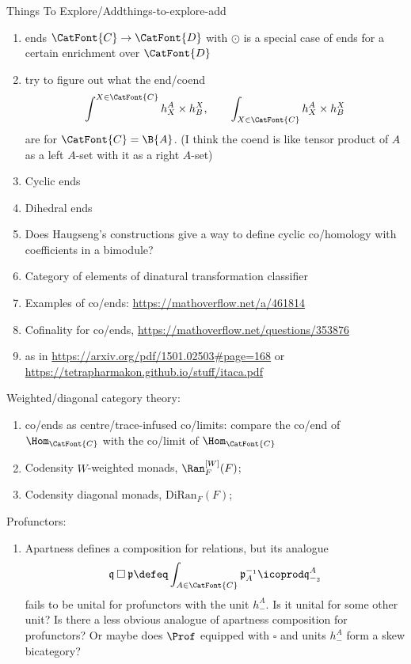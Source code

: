 \begin{remark}{Things To Explore/Add}{things-to-explore-add}
\begin{enumerate}
\[\begin{aligned}
                    \int^{A\in\CatFont{C}}\Sets(F_{A},h^{A})
                \end{aligned}
            \]%
            are.
        \item ends $\CatFont{C}\to\CatFont{D}$ with $\odot$ is a special case of ends for a certain enrichment over $\CatFont{D}$
        \item try to figure out what the end/coend
            \[
                \int^{X\in\CatFont{C}}h^{A}_{X}\times h^{X}_{B},%
                \qquad%
                \int_{X\in\CatFont{C}}h^{A}_{X}\times h^{X}_{B}%
            \]%
            are for $\CatFont{C}=\B{A}$. (I think the coend is like tensor product of $A$ as a left $A$-set with it as a right $A$-set)
        \item Cyclic ends
        \item Dihedral ends
        \item Does Haugseng's constructions give a way to define cyclic co/homology with coefficients in a bimodule?
        \item Category of elements of dinatural transformation classifier
        \item Examples of co/ends: \url{https://mathoverflow.net/a/461814}
        \item Cofinality for co/ends, \url{https://mathoverflow.net/questions/353876}
        \item {} as in \url{https://arxiv.org/pdf/1501.02503#page=168} or \url{https://tetrapharmakon.github.io/stuff/itaca.pdf}
    \end{enumerate}
    Weighted/diagonal category theory:
    \begin{enumerate}
        \item co/ends as centre/trace-infused co/limits: compare the co/end of $\Hom_{\CatFont{C}}$ with the co/limit of $\Hom_{\CatFont{C}}$
        \item Codensity $W$-weighted monads, $\Ran^{[W]}_{F}(F)$;
        \item Codensity diagonal monads, $\mathrm{DiRan}_{F}(F)$;
    \end{enumerate}
    Profunctors:
    \begin{enumerate}
        \item Apartness defines a composition for relations, but its analogue
            \[
                \mathfrak{q}\mathbin{\square}\mathfrak{p}%
                \defeq%
                \int_{A\in\CatFont{C}}\mathfrak{p}^{-_{1}}_{A}\icoprod\mathfrak{q}^{A}_{-_{2}}%
            \]%
            fails to be unital for profunctors with the unit $h^{A}_{-}$. Is it unital for some other unit? Is there a less obvious analogue of apartness composition for profunctors? Or maybe does $\Prof$ equipped with $\square$ and units $h^{A}_{-}$ form a skew bicategory?


\end{enumerate}
\end{remark}
